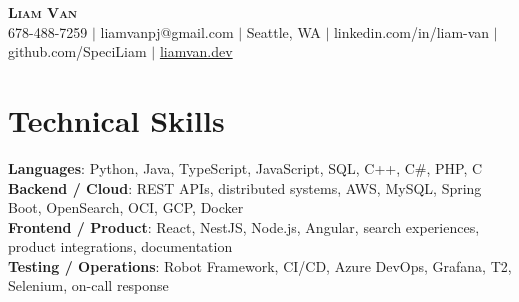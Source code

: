 \documentclass[letterpaper,11pt]{article}
\begin{document}

%
\begin{center}
    \textbf{\Huge \scshape Liam Van} \\ \vspace{1pt}
    \small 678-488-7259 $|$ \small {liamvanpj@gmail.com} $|$ Seattle, WA
 {{$|$ linkedin.com/in/liam-van} {$|$ github.com/SpeciLiam} {$|$ \href{https://liamvan.dev}{liamvan.dev}}}

\end{center}

\section{Technical Skills}
 \begin{itemize}[leftmargin=0.15in, label={}]
    \small{\item{
     \textbf{Languages}{: Python, Java, TypeScript, JavaScript, SQL, C++, C\#, PHP, C} \\
     \textbf{Backend / Cloud}{: REST APIs, distributed systems, AWS, MySQL, Spring Boot, OpenSearch, OCI, GCP, Docker} \\
     \textbf{Frontend / Product}{: React, NestJS, Node.js, Angular, search experiences, product integrations, documentation} \\
     \textbf{Testing / Operations}{: Robot Framework, CI/CD, Azure DevOps, Grafana, T2, Selenium, on-call response} \\
    }}
 \end{itemize}
%

\end{document}
